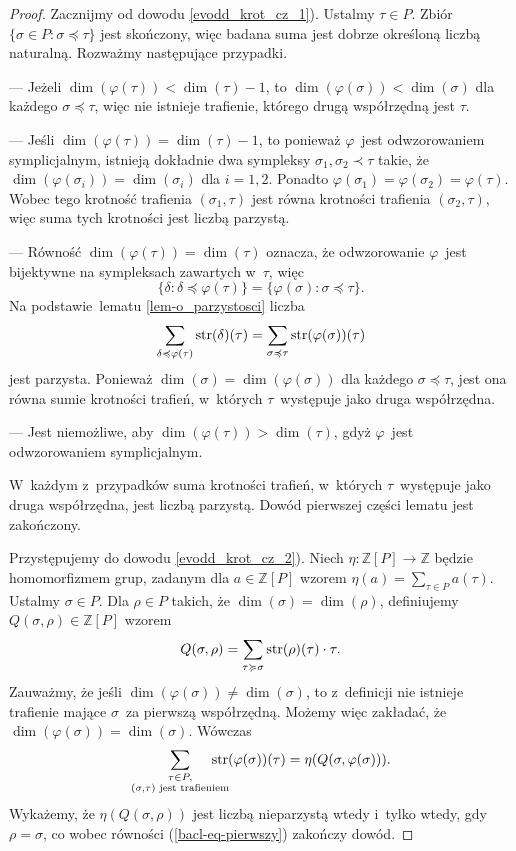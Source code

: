 \begin{proof}
Zacznijmy od dowodu \ref{evodd_krot_cz_1}). Ustalmy $\tau\in P$.
Zbiór $\{\sigma\in P:\sigma\preceq \tau\}$ jest skończony, więc badana suma jest dobrze określoną liczbą naturalną. Rozważmy następujące przypadki.
\begin{compactitem}
\item[---] Jeżeli $\dim(\varphi(\tau))<\dim(\tau)-1$, to $\dim(\varphi(\sigma))<\dim(\sigma)$ dla każdego $\sigma\preceq \tau$, więc nie istnieje trafienie, którego drugą współrzędną jest $\tau$.
\item[---] Jeśli $\dim(\varphi(\tau))=\dim(\tau)-1$, to ponieważ $\varphi$~jest odwzorowaniem symplicjalnym, istnieją dokładnie dwa sympleksy $\sigma_1,\sigma_2\prec\tau$ takie, że $\dim(\varphi(\sigma_i))=\dim(\sigma_i)$ dla $i=1,2$. Ponadto $\varphi(\sigma_1)=\varphi(\sigma_2)=\varphi(\tau)$. Wobec tego krotność trafienia $(\sigma_1,\tau)$ jest równa krotności trafienia $(\sigma_2,\tau)$, więc suma tych krotności jest liczbą parzystą.
\item[---] Równość $\dim(\varphi(\tau))=\dim(\tau)$ oznacza, że odwzorowanie $\varphi$~jest bijektywne na sympleksach zawartych w~$\tau$, więc \[\{\delta:\delta\preceq \varphi(\tau)\}=\{\varphi(\sigma):\sigma\preceq\tau\}.\] Na podstawie~lematu \ref{lem-o_parzystosci} liczba \[\sum_{\delta\preccurlyeq\varphi(\tau)}\operatorname{str}(\delta)(\tau)=\sum_{\sigma\preccurlyeq\tau}\operatorname{str}(\varphi(\sigma))(\tau)\] jest parzysta. Ponieważ $\dim(\sigma)=\dim(\varphi(\sigma))$ dla każdego $\sigma\preceq\tau$, jest ona równa sumie krotności trafień, w~których $\tau$~występuje jako druga współrzędna.
\item[---] Jest niemożliwe, aby $\dim(\varphi(\tau))>\dim(\tau)$, gdyż $\varphi$~jest odwzorowaniem symplicjalnym.
\end{compactitem}

W~każdym z~przypadków suma krotności trafień, w~których $\tau$~występuje jako druga współrzędna, jest liczbą parzystą. Dowód pierwszej części lematu jest zakończony.

Przystępujemy do dowodu \ref{evodd_krot_cz_2}). Niech $\eta\colon \mathbb{Z}[P]\to\mathbb{Z}$ będzie homomorfizmem grup, zadanym dla $a\in \mathbb{Z}[P]$ wzorem $\eta(a)=\sum_{\tau\in P}a(\tau)$. Ustalmy $\sigma\in P$. Dla $\rho\in P$ takich, że $\dim(\sigma)=\dim(\rho)$, definiujemy $Q(\sigma,\rho)\in \mathbb{Z}[P]$ wzorem \[Q(\sigma,\rho)=\sum_{\tau\succcurlyeq\sigma}\operatorname{str}(\rho)(\tau)\cdot \tau.\] Zauważmy, że jeśli $\dim(\varphi(\sigma))\not=\dim(\sigma)$, to z~definicji nie istnieje trafienie mające $\sigma$~za pierwszą współrzędną. Możemy więc zakładać, że $\dim(\varphi(\sigma))=\dim(\sigma)$. Wówczas
\begin{align}\sum_{\substack{\tau\in P,\\(\sigma,\tau)\text{ jest trafieniem}}}\hspace{-0.5cm}\str(\varphi(\sigma))(\tau)=\eta(Q(\sigma,\varphi(\sigma))).\label{bacl-eq-pierwszy}\end{align}
Wykażemy, że $\eta(Q(\sigma,\rho))$ jest liczbą nieparzystą wtedy i~tylko wtedy, gdy $\rho=\sigma$, co wobec równości (\ref{bacl-eq-pierwszy}) zakończy dowód.


\end{proof}
